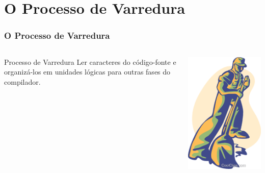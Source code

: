\documentclass[table]{beamer}
\begin{document}
\section{O Processo de Varredura}
\begin{frame}
   \frametitle{O Processo de Varredura}
   \begin{columns}
      \begin{column}{0.5\textwidth}
         \begin{block}{Processo de Varredura}
	 Ler caracteres do código-fonte e organizá-los em unidades lógicas para outras fases do compilador.
	 \end{block}
      \end{column}
      \begin{column}{0.5\textwidth}
         \includegraphics[width=\linewidth,height=\textheight,keepaspectratio]{figuras/varrer.png}
      \end{column}
   \end{columns}
\end{frame}
\end{document}
